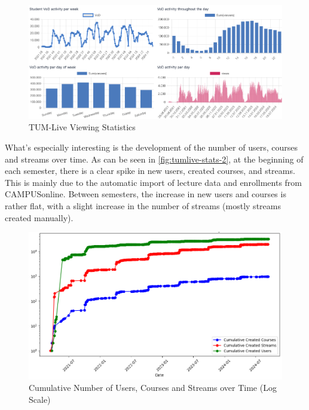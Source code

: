 \begin{figure}[htpb]
    \centering
    \includegraphics[width=\linewidth]{images/TUMLiveStatsNew.png}
    \caption[TUM-Live Statistics]{TUM-Live Viewing Statistics}\label{fig:tumlive-stats}
\end{figure}

\noindent What's especially interesting is the development of the number of users, courses and streams over time. As can be seen in \autoref{fig:tumlive-stats-2}, at the beginning of each semester, there is a clear spike in new users, created courses, and streams. This is mainly due to the automatic import of lecture data and enrollments from CAMPUSonline. Between semesters, the increase in new users and courses is rather flat, with a slight increase in the number of streams (mostly streams created manually).  

\begin{figure}[htpb]
    \centering
    \includegraphics[width=\linewidth]{images/TUMLiveStats2.png}
    \caption[Cumulative Number of Users, Courses and Streams over Time (Log Scale)]{Cumulative Number of Users, Courses and Streams over Time (Log Scale)}\label{fig:tumlive-stats-2}
\end{figure}
